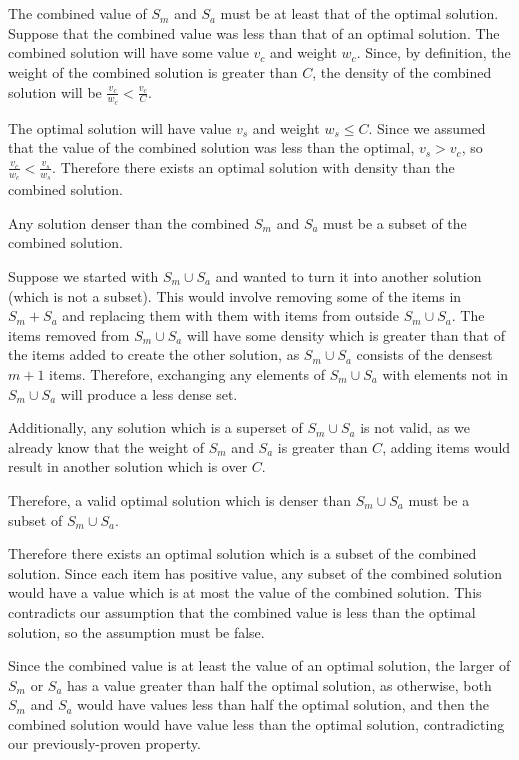 \documentclass[11pt]{article}
\begin{document}
\section{}

The combined value of $S_m$ and $S_a$ must be at least that of the optimal solution. Suppose that the combined value was less than that of an optimal solution. The combined solution will have some value $v_c$ and weight $w_c$. Since, by definition, the weight of the combined solution is greater than $C$, the density of the combined solution will be $\frac{v_c}{w_c} < \frac{v_c}{C}$. 

The optimal solution will have value $v_s$ and weight $w_s \leq C$. Since we assumed that the value of the combined solution was less than the optimal, $v_s > v_c$, so $\frac{v_c}{w_c} < \frac{v_s}{w_s}$. Therefore there exists an optimal solution with density than the combined solution.

Any solution denser than the combined $S_m$ and $S_a$ must be a subset of the combined solution.

Suppose we started with $S_m \cup S_a$ and wanted to turn it into another solution (which is not a subset). This would involve removing some of the items in $S_m + S_a$ and replacing them with them with items from outside $S_m \cup S_a$. The items removed from $S_m \cup S_a$ will have some density which is greater than that of the items added to create the other solution, as $S_m \cup S_a$ consists of the densest $m+1$ items. Therefore, exchanging any elements of $S_m \cup S_a$ with elements not in $S_m \cup S_a$ will produce a less dense set.

Additionally, any solution which is a superset of $S_m \cup S_a$ is not valid, as we already know that the weight of $S_m$ and $S_a$ is greater than $C$, adding items would result in another solution which is over $C$.

Therefore, a valid optimal solution which is denser than $S_m \cup S_a$ must be a subset of $S_m \cup S_a$.

Therefore there exists an optimal solution which is a subset of the combined solution. Since each item has positive value, any subset of the combined solution would have a value which is at most the value of the combined solution. This contradicts our assumption that the combined value is less than the optimal solution, so the assumption must be false.

Since the combined value is at least the value of an optimal solution, the larger of $S_m$ or $S_a$ has a value greater than half the optimal solution, as otherwise, both $S_m$ and $S_a$ would have values less than half the optimal solution, and then the combined solution would have value less than the optimal solution, contradicting our previously-proven property.
\end{document}
